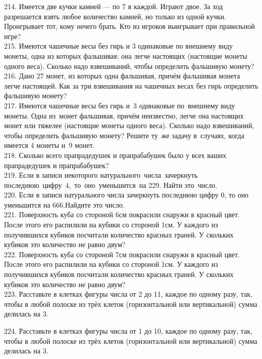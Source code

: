 214. Имеется две кучки камней --- по 7 в каждой. Играют двое. За ход разрешается взять любое количество камней, но только из одной кучки. Проигрывает тот, кому нечего брать. Кто из игроков выигрывает при правильной игре?\\
215. Имеются чашечные весы без гирь и 3 одинаковые по внешнему виду монеты, одна из которых фальшивая: она легче настоящих (настоящие монеты одного веса). Сколько надо взвешиваний, чтобы определить фальшивую монету?\\
216. Дано 27 монет, из которых одна фальшивая, причём фальшивая монета легче настоящей. Как за три взвешивания на чашечных весах без гирь определить фальшивую монету?\\
217. Имеются чашечные весы без гирь и 3 одинаковые по внешнему виду монеты. Одна из монет фальшивая, причём неизвестно, легче она настоящих монет или тяжелее (настоящие монеты одного веса). Сколько надо взвешиваний, чтобы определить фальшивую монету? Решите ту же задачу в случаях, когда имеется 4 монеты и 9 монет.\\
218. Сколько всего прапрадедушек и прапрабабушек было у всех ваших прапрадедушек и прапрабабушек?\\
219. Если в записи некоторого натурального числа зачеркнуть последнюю цифру 4, то оно уменьшится на 229. Найти это число.\\
220. Если в записи натурального числа зачеркнуть последнюю цифру 0, то оно уменьшится на 666.Найдите это число.\\
221. Поверхность куба со стороной 6см покрасили снаружи в красный цвет. После этого его распилили на кубики со стороной 1см. У каждого из получившихся кубиков посчитали количество красных граней. У скольких кубиков это количество не равно двум?\\
222. Поверхность куба со стороной 7см покрасили снаружи в красный цвет. После этого его распилили на кубики со стороной 1см. У каждого из получившихся кубиков посчитали количество красных граней. У скольких кубиков это количество не равно двум?\\
223. Расставьте в клетках фигуры числа от 2 до 11, каждое по одному разу, так, чтобы в любой полоске из трёх клеток (горизонтальной или вертикальной) сумма делилась на 3.
\begin{center}
\begin{figure}[ht!]
\end{figure}
\end{center}
224. Расставьте в клетках фигуры числа от 1 до 10, каждое по одному разу, так, чтобы в любой полоске из трёх клеток (горизонтальной или вертикальной) сумма делилась на 3.
